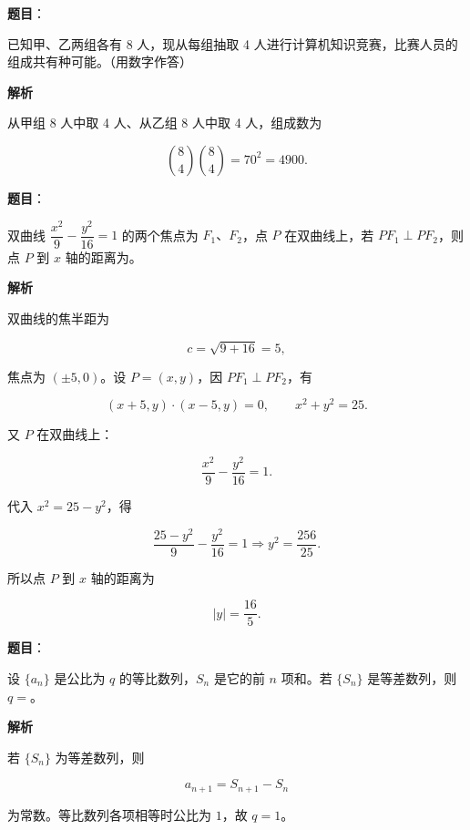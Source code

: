 \begin{answer}

\textbf{题目}：

已知甲、乙两组各有 8 人，现从每组抽取 4 人进行计算机知识竞赛，比赛人员的组成共有\gkblank{}种可能。（用数字作答）

\textbf{解析}

从甲组 8 人中取 4 人、从乙组 8 人中取 4 人，组成数为

\nopagebreak[4]
\[
\binom84\binom84=70^2=4900.
\]


\end{answer}
\begin{answer}

\textbf{题目}：

双曲线 $\dfrac{x^2}{9}-\dfrac{y^2}{16}=1$ 的两个焦点为 $F_1\text{、}F_2$，点 $P$ 在双曲线上，若 $PF_1\perp PF_2$，则点 $P$ 到 $x$ 轴的距离为\gkblank{}。

\textbf{解析}

双曲线的焦半距为

\nopagebreak[4]
\[
c=\sqrt{9+16}=5,
\]

焦点为 $(\pm5,0)$。设 $P=(x,y)$，因 $PF_1\perp PF_2$，有

\nopagebreak[4]
\[
(x+5,y)\cdot(x-5,y)=0,
\qquad x^2+y^2=25.
\]

又 $P$ 在双曲线上：

\nopagebreak[4]
\[
\frac{x^2}{9}-\frac{y^2}{16}=1.
\]

代入 $x^2=25-y^2$，得

\nopagebreak[4]
\[
\frac{25-y^2}{9}-\frac{y^2}{16}=1
\Longrightarrow y^2=\frac{256}{25}.
\]

所以点 $P$ 到 $x$ 轴的距离为

\nopagebreak[4]
\[
|y|=\frac{16}{5}.
\]


\end{answer}
\begin{answer}

\textbf{题目}：

设 $\{a_n\}$ 是公比为 $q$ 的等比数列，$S_n$ 是它的前 $n$ 项和。若 $\{S_n\}$ 是等差数列，则 $q=$\gkblank{}。

\textbf{解析}

若 $\{S_n\}$ 为等差数列，则

\nopagebreak[4]
\[
a_{n+1}=S_{n+1}-S_n
\]

为常数。等比数列各项相等时公比为 $1$，故 $q=1$。


\end{answer}
